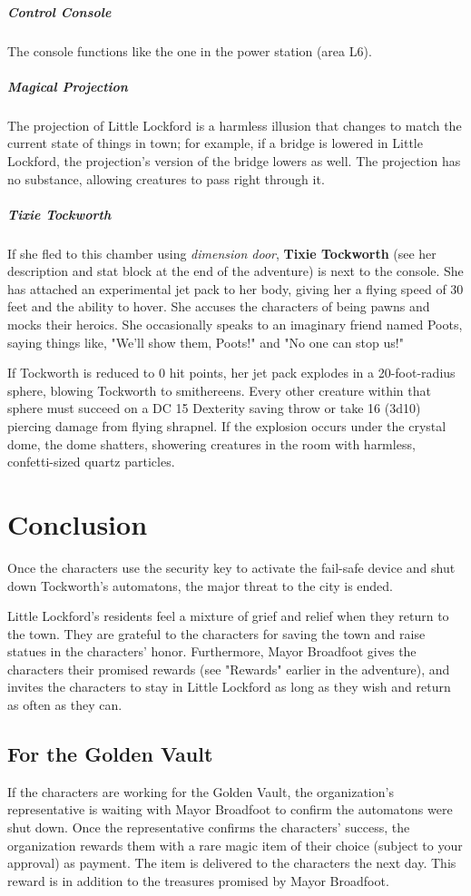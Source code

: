 \documentclass[10pt,a4paper,twoside,bg=print,twocolumn,openany,nodeprecatedcode]{dndbook}
\begin{document}
\subparagraph{Control Console}
The console functions like the one in the power station (area L6).

\subparagraph{Magical Projection}
The projection of Little Lockford is a harmless illusion that changes to match the current state of things in town; for example, if a bridge is lowered in Little Lockford, the projection's version of the bridge lowers as well. The projection has no substance, allowing creatures to pass right through it.

\subparagraph{Tixie Tockworth}
If she fled to this chamber using \textit{dimension door}, \textbf{Tixie Tockworth} (see her description and stat block at the end of the adventure) is next to the console. She has attached an experimental jet pack to her body, giving her a flying speed of 30 feet and the ability to hover. She accuses the characters of being pawns and mocks their heroics. She occasionally speaks to an imaginary friend named Poots, saying things like, "We'll show them, Poots!" and "No one can stop us!"

If Tockworth is reduced to 0 hit points, her jet pack explodes in a 20-foot-radius sphere, blowing Tockworth to smithereens. Every other creature within that sphere must succeed on a DC 15 Dexterity saving throw or take 16 (3d10) piercing damage from flying shrapnel. If the explosion occurs under the crystal dome, the dome shatters, showering creatures in the room with harmless, confetti-sized quartz particles.

\section{Conclusion}
Once the characters use the security key to activate the fail-safe device and shut down Tockworth's automatons, the major threat to the city is ended.

Little Lockford's residents feel a mixture of grief and relief when they return to the town. They are grateful to the characters for saving the town and raise statues in the characters' honor. Furthermore, Mayor Broadfoot gives the characters their promised rewards (see "Rewards" earlier in the adventure), and invites the characters to stay in Little Lockford as long as they wish and return as often as they can.

\subsection{For the Golden Vault}
If the characters are working for the Golden Vault, the organization's representative is waiting with Mayor Broadfoot to confirm the automatons were shut down. Once the representative confirms the characters' success, the organization rewards them with a rare magic item of their choice (subject to your approval) as payment. The item is delivered to the characters the next day. This reward is in addition to the treasures promised by Mayor Broadfoot.
\end{document}
